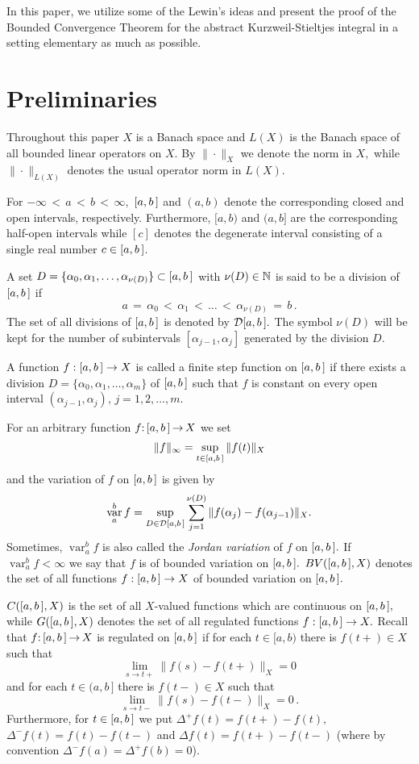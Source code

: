 \documentclass[12pt,twoside]{article}
\numberwithin{equation}{section}
\theoremstyle{plain}
\theoremstyle{definition}
\DeclareMathOperator{\var}{var}
\begin{document}
{\smallskip

In this paper, we utilize some of the Lewin's ideas and present the proof of the Bounded
Convergence Theorem for the abstract Kurzweil-Stieltjes integral in a setting elementary
as much as possible.

\section{Preliminaries}
Throughout this paper $X$ is a Banach space and $L(X)$ is the Banach space of all bounded
linear operators on $X.$ By $\|\cdot\|_X$ we denote the norm in $X,$ while
$\|\cdot\|_{L(X)}$ denotes the usual operator norm in $L(X).$

\skipaline

For $-\infty\,{<}\,a\,{<}\,b\,{<}\,\infty,$ $[a,b\,]$ and $(a,b)$ denote the corresponding
closed and open intervals, respectively. Furthermore, $[a,b)$ and $(a,b]$ are
the corresponding half-open intervals while $[c]$ denotes the degenerate interval consisting
of a single real number $c\in[a,b\,]$.

\skipaline

A set $D=\{\alpha_0,\alpha_1,\dots,\alpha_{\nu(D)}\}\subset[a,b\,]$ with $\nu(D)\in{\mathbb N}$
is said to be a division of $[a,b\,]$ if
\[
    a\,{=}\,\alpha_0\,{<}\,\alpha_1\,{<}\,\dots\,{<}\,\alpha_{\nu(D)}\,{=}\,b\,.
\]
The set of all divisions of $[a,b\,]$ is denoted by $\mathcal D[a,b\,].$ The symbol $\nu(D)$
will be kept for the number of subintervals $[\alpha_{j-1},\alpha_j]$ generated by
the division $D.$

\skipaline

A function $f:[a,b\,]\to X$ is called a finite step function on $[a,b\,]$ if there exists
a division $D=\{\alpha_0,\alpha_1,\dots,\alpha_m\}$ of $[a,b\,]$ such that $f$ is constant
on every open interval $(\alpha_{j-1},\alpha_j),\,j=1,2,\dots,m.$

\skipaline

For an arbitrary function $f{:}\,[a,b\,]\,{\to}\,X$ we set
\[
    \|f\|_{\infty}=\sup_{t\in[a,b\,]}\|f(t)\|_X
\]
and the variation of $f$ on $[a,b\,]$ is given by
\[
   \var_a^b f
   =\sup_{D\in\mathcal D\ab}\sum_{j=1}^{\nu(D)}\|f(\alpha_j)-f(\alpha_{j-1})\|_X.
\]
Sometimes, $\var_a^b f$ is also called the {\em Jordan variation} of $f$ on $[a,b\,].$
If $\var_a^b f<\infty$ we say that $f$ is of bounded variation on $[a,b\,].$ $BV([a,b\,],X)$
denotes the set of all functions $f:[a,b\,]\to X$ of bounded variation on $[a,b\,].$

\skipaline

$C([a,b\,], X)$ is the set of all $X$-valued functions which are continuous on $[a,b\,],$ while
$G([a,b\,],X)$ denotes the set of all regulated functions $f:[a,b\,]\to X.$ Recall that
$f{:}\,[a,b\,]\,{\to}\,X$ is regulated on $[a,b\,]$ if for each $t\in[a,b)$ there is $f(t+)\in X$
such that
\[
   \lim_{s\to t+}\|f(s)-f(t+)\|_X=0
\]
and for each $t\in (a,b\,]$ there is $f(t-)\in X$ such that
\[
   \lim_{s\to t-}\|f(s)- f(t-)\|_X=0\,.
\]
Furthermore, for $t\in[a,b\,]$ we put $\Delta^+f(t)=f(t+)-f(t),$ $\Delta^-f(t)=f(t)-f(t-)$ and
$\Delta f(t)=f(t+)-f(t-)$ (where by convention $\Delta^-f(a)=\Delta^+f(b)=0$).

}
\end{document}
